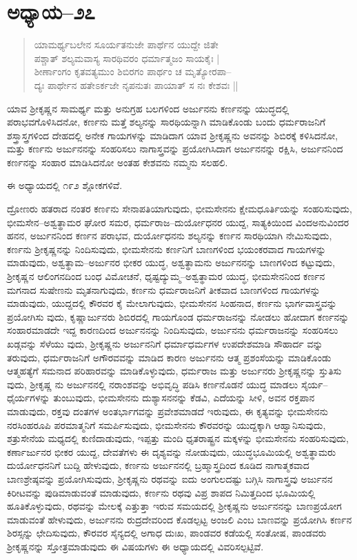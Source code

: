 \section{ಅಧ್ಯಾಯ–೨೭}

\begin{verse}
ಯಾಮರ್ಥ್ಯಬಲೇನ ಸೂರ್ಯತನುಜೇ ಪಾರ್ಥೆನ ಯುದ್ದೇ ಜಿತೇ\\ ಪಶ್ಚಾತ್ ಶಲ್ಯಮವಾಸ್ಯ ಸಾರಥಿವರಂ ಧರ್ಮಾತ್ಮಜಂ ಸಾಯಕೈಃ |\\ ಶೀರ್ಣಾಂಗಂ ಕೃತವತ್ಯಮುಂ ಶಿಬಿರಗಂ ಪಾರ್ಥಂ ಚ ಮೃತ್ಯೋರಪಾ–\\ ದ್ಯಃ ಪಾರ್ಥೇನ ಹತೇಽರ್ಕಜೇ ನೃಪನುತಃ ಪಾಯಾತ್ ಸ ನಃ ಕೇಶವಃ ||
\end{verse}

ಯಾವ ಶ‍್ರೀಕೃಷ್ಣನ ಸಾಮರ್ಥ್ಯ ಮತ್ತು ಅನುಗ್ರಹ ಬಲಗಳಿಂದ ಅರ್ಜುನನು ಕರ್ಣನನ್ನು ಯುದ್ಧದಲ್ಲಿ ಪರಾಭವಗೊಳಿಸಿದನೋ, ಕರ್ಣನು ಮತ್ತೆ ಶಲ್ಯನನ್ನು ಸಾರಥಿಯನ್ನಾಗಿ ಮಾಡಿಕೊಂಡು ಬಂದು ಧರ್ಮರಾಜನಿಗೆ ಶಸ್ತ್ರಾಸ್ತ್ರಗಳಿಂದ ದೇಹದಲ್ಲಿ ಅನೇಕ ಗಾಯಗಳನ್ನು ಮಾಡಿದಾಗ ಯಾವ ಶ‍್ರೀಕೃಷ್ಣನು ಅವನನ್ನು ಶಿಬಿರಕ್ಕೆ ಕಳಿಸಿದನೋ, ಮತ್ತು ಕರ್ಣನು ಅರ್ಜುನನನ್ನು ಸಂಹರಿಸಲು ನಾಗಾಸ್ತ್ರವನ್ನು ಪ್ರಯೋಗಿಸಿದಾಗ ಅರ್ಜುನನನ್ನು ರಕ್ಷಿಸಿ, ಅರ್ಜುನನಿಂದ ಕರ್ಣನನ್ನು ಸಂಹಾರ ಮಾಡಿಸಿದನೋ ಅಂತಹ ಕೇಶವನು ನಮ್ಮನು ಸಲಹಲಿ.

ಈ ಅಧ್ಯಾಯದಲ್ಲಿ ೧೯೨ ಶ್ಲೋಕಗಳಿವೆ.

ದ್ರೋಣರು ಹತರಾದ ನಂತರ ಕಣ೯ನು ಸೇನಾಪತಿಯಾಗುವುದು, ಭೀಮಸೇನನು ಕ್ಷೇಮಧೂರ್ತಿಯನ್ನು ಸಂಹರಿಸುವುದು, ಭೀಮಸೇನ–ಅಶ್ವತ್ಥಾಮರ ಘೋರ ಸಮರ, ಧರ್ಮರಾಜ–ದುರ್ಯೋಧನರ ಯುದ್ದ, ಸಾತ್ಯಕಿಯಿಂದ ವಿಂದಅನುವಿಂದರ ಹನನ, ಅರ್ಜುನನಿಂದ ಕರ್ಣನ ಪರಾಭವ, ದುರ್ಯೋಧನನು ಶಲ್ಯನನ್ನು ಕರ್ಣನ ಸಾರಥಿಯಾಗಿ ನೇಮಿಸುವುದು, ಕರ್ಣನು ಶ‍್ರೀಕೃಷ್ಣನನ್ನು ನಿಂದಿಸುವುದು, ಭೀಮಸೇನನು ಕರ್ಣನಿಗೆ ಬಾಣಗಳಿಂದ ಭಯಂಕರವಾದ ಗಾಯಗಳನ್ನು ಮಾಡುವುದು, ಅಶ್ವತ್ಥಾಮ–ಅರ್ಜುನರ ಭೀಕರ ಯುದ್ಧ, ಅಶ್ವತ್ಥಾಮನು ಅರ್ಜುನನನ್ನು ಬಾಣಗಳಿಂದ ಕಟ್ಟುವುದು, ಶ‍್ರೀಕೃಷ್ಣನ ಆಲಿಂಗನದಿಂದ ಬಂಧ ವಿಮೋಚನೆ, ಧೃಷ್ಟದ್ಯುಮ್ಮ–ಅಶ್ವತ್ಥಾಮರ ಯುದ್ಧ, ಭೀಮಸೇನನಿಂದ ಕರ್ಣನ ಮಗನಾದ ಸುಷೇಣನು ಮೃತನಾಗುವುದು, ಕರ್ಣನು ಧರ್ಮರಾಜನಿಗೆ ತೀಕವಾದ ಬಾಣಗಳಿಂದ ಗಾಯಗಳನ್ನು ಮಾಡುವುದು, ಯುದ್ದದಲ್ಲಿ ಕೌರವರ ಕೈ ಮೇಲಾಗುವುದು, ಭೀಮಸೇನನ ಸಿಂಹನಾದ, ಕರ್ಣನು ಭಾರ್ಗವಾಸ್ತ್ರವನ್ನು ಪ್ರಯೋಗಿಸು ವುದು, ಕೃಷ್ಣಾರ್ಜುನರು ಶಿಬಿರದಲ್ಲಿ ಗಾಯಗೊಂಡ ಧರ್ಮರಾಜನನ್ನು ನೋಡಲು ಹೋದಾಗ ಕರ್ಣನನ್ನು ಸಂಹಾರಮಾಡದೇ ಇದ್ದ ಕಾರಣದಿಂದ ಅರ್ಜುನನನ್ನು ನಿಂದಿಸುವುದು, ಅರ್ಜುನನು ಧರ್ಮರಾಜನನ್ನು ಸಂಹರಿಸಲು ಖಡ್ಗವನ್ನು ಸೆಳೆಯು ವುದು, ಶ‍್ರೀಕೃಷ್ಣನು ಅರ್ಜುನನಿಗೆ ಧರ್ಮಾಧರ್ಮಗಳ ಉಪದೇಶಮಾಡಿ ಸೌಹಾರ್ದ ವನ್ನು ತರುವುದು, ಧರ್ಮರಾಜನಿಗೆ ಅಗೌರವವನ್ನು ಮಾಡಿದ ಕಾರಣ ಅರ್ಜುನನು ಆತ್ಮ ಪ್ರಶಂಸೆಯನ್ನು ಮಾಡಿಕೊಂಡು ಆತ್ಮಹತ್ಯೆಗೆ ಸಮನಾದ ಪರಿಹಾರವನ್ನು ಮಾಡಿಕೊಳ್ಳುವುದು, ಧರ್ಮರಾಜ ಮತ್ತು ಅರ್ಜುನರು ಶ‍್ರೀಕೃಷ್ಣನನ್ನು ಸ್ತುತಿಸು ವುದು, ಶ‍್ರೀಕೃಷ್ಣ ನು ಅರ್ಜುನನಲ್ಲಿ ನರಾಂಶವನ್ನು ಅಭಿವೃದ್ಧಿ ಪಡಿಸಿ ಕರ್ಣನೊಡನೆ ಯುದ್ಧ ಮಾಡಲು ಸೈರ್ಯ–ಧೈರ್ಯಗಳನ್ನು ತುಂಬುವುದು, ಭೀಮಸೇನನು ದುಶ್ಯಾಸನನನ್ನು ಕೆಡವಿ, ಎದೆಯನ್ನು ಸೀಳಿ, ಅವನ ರಕ್ತಪಾನ ಮಾಡುವುದು, ರಕ್ತವು ದಂತಗಳ ಅಂತರ್ಭಾಗವನ್ನು ಪ್ರವೇಶಮಾಡದೆ ಇರುವುದು, ಈ ಕೃತ್ಯವನ್ನು ಭೀಮಸೇನನು ನರಸಿಂಹರೂಪಿ ಪರಮಾತ್ಮನಿಗೆ ಸಮರ್ಪಿಸುವುದು, ಭೀಮಸೇನನು ಕೌರವರನ್ನು ಯುದ್ದಕ್ಕಾಗಿ ಆಹ್ವಾನಿಸುವುದು, ಶತ್ರುಸೇನೆಯ ಮಧ್ಯದಲ್ಲಿ ಕುಣಿದಾಡುವುದು, ಇಪ್ಪತ್ತು ಮಂದಿ ಧೃತರಾಷ್ಟ್ರನ ಮಕ್ಕಳನ್ನು ಭೀಮಸೇನನು ಸಂಹರಿಸುವುದು, ಕರ್ಣಾರ್ಜುನರ ಭೀಕರ ಯುದ್ದ, ದೇವತೆಗಳು ಈ ದೃಶ್ಯವನ್ನು ನೋಡುವುದು, ಯುದ್ಧಭೂಮಿಯಲ್ಲಿ ಅಶ್ವತ್ಥಾಮರು ದುರ್ಯೋಧನನಿಗೆ ಬುದ್ದಿ ಹೇಳುವುದು, ಕರ್ಣನು ಅರ್ಜುನನಲ್ಲಿ ಬ್ರಹ್ಮಾಸ್ತ್ರದಿಂದ ಕೂಡಿದ ನಾಗಾತ್ಮಕವಾದ ಬಾಣಶ್ರೇಷ್ಠವನ್ನು ಪ್ರಯೋಗಿಸುವುದು, ಶ‍್ರೀಕೃಷ್ಣನು ರಥವನ್ನು ಐದು ಅಂಗುಲದಷ್ಟು ಬಗ್ಗಿಸಿ ನಾಗಾಸ್ತ್ರವು ಅರ್ಜುನನ ಕಿರೀಟವನ್ನು ಪುಡಿಮಾಡುವಂತೆ ಮಾಡುವುದು, ಕರ್ಣನು ರಥವು ವಿಪ್ರ ಶಾಪದ ನಿಮಿತ್ತದಿಂದ ಭೂಮಿಯಲ್ಲಿ ಹೂತಿಕೊಳ್ಳುವುದು, ರಥವನ್ನು ಮೇಲಕ್ಕೆ ಎತ್ತುತ್ತಾ ಇರುವ ಸಮಯದಲ್ಲಿ ಶ‍್ರೀಕೃಷ್ಣನು ಅರ್ಜುನನನ್ನು ಬಾಣಪ್ರಯೋಗ ಮಾಡುವಂತೆ ಹೇಳುವುದು, ಅರ್ಜುನನು ರುದ್ರದೇವರಿಂದ ಕೊಡಲ್ಪಟ್ಟ ಅಂಜಲಿ ಎಂಬ ಬಾಣವನ್ನು ಪ್ರಯೋಗಿಸಿ ಕರ್ಣನ ಶಿರಸ್ಸನ್ನು ಛೇದಿಸುವುದು, ಕೌರವರ ಸೈನ್ಯದಲ್ಲಿ ಅಗಾಧ ದುಃಖ, ಪಾಂಡವರ ಕಡೆಯಲ್ಲಿ ಸಂತೋಷ, ಪಾಂಡವರು ಶ‍್ರೀಕೃಷ್ಣನನ್ನು ಸ್ತೋತ್ರಮಾಡುವುದು ಈ ವಿಷಯಗಳು ಈ ಅಧ್ಯಾಯದಲ್ಲಿ ವಿವರಿಸಲ್ಪಟ್ಟಿವೆ.


